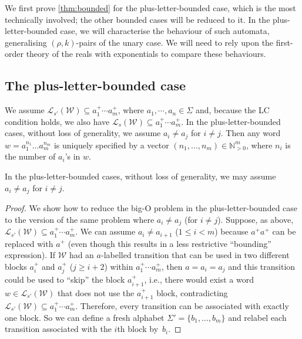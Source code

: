\documentclass[10pt,a4paper]{amsart}
\numberwithin{equation}{section}
\theoremstyle{plain}
\theoremstyle{definition}
\theoremstyle{remark}
\newcommand\lng[2]{\mathcal{L}_{#1}(#2)}
\newcommand\chr{a}
\newcommand\wa{\mathcal{W}}
\begin{document}
We first prove \cref{thm:bounded} for the plus-letter-bounded case, which is the most technically involved; the other bounded cases will be reduced to it.
 In the plus-letter-bounded case, we will characterise the behaviour of such automata, generalising $(\rho,k)$-pairs of the unary case.
We will  need to rely upon the first-order theory of the reals with exponentials to compare these behaviours.

\subsection{The plus-letter-bounded case}
\label{sec:plusletterbounded}
We assume $\lng{s'}{\wa} \subseteq a_1^+\cdots a_m^+$, where $a_1, \cdots, a_n\in\Sigma$ and, because the LC condition holds, we also have  $\lng{s}{\wa} \subseteq a_1^+\cdots a_m^+$. In the plus-letter-bounded cases, without loss of generality, we assume $\chr_i\ne \chr_j$ for $i\neq j$.  Then any word $w = a_1^{n_1}\dots a_m^{n_m}$ is uniquely specified by a vector $(n_1,\dots,n_m)\in \mathbb{N}^m_{>0}$, where $n_i$ is the number of $a_i$'s in $w$.

\begin{prop}\label{claim:plbadditionaform}
In the plus-letter-bounded cases, without loss of generality, we may assume $\chr_i\ne \chr_j$ for $i\neq j$.
\end{prop}
\begin{proof}
We show how to reduce the big-O problem in the plus-letter-bounded case to the version of the same problem where $\chr_i\ne \chr_j$ (for $i\neq j$). Suppose, as above, $\lng{s'}{\wa} \subseteq a_1^+\cdots a_m^+$.
We can assume $a_i\neq a_{i+1}$ ($1\le i < m$) because $a^+ a^+$ can be replaced with $a^+$ (even though this results in a less restrictive ``bounding'' expression).
If $\wa$ had an $a$-labelled transition that can be used in two different blocks $a_i^+$ and $a_j^+$ ($j \ge i+2$) within $a_1^+\cdots a_m^+$, then $a = a_i = a_j$ and this transition could be used to ``skip'' the block $a_{i+1}^+$, i.e., there would exist a word $w \in \lng{s'}{\wa}$ that does not use the $a_{i+1}^+$ block, contradicting  $\lng{s'}{\wa} \subseteq a_1^+\cdots a_m^+$.
Therefore, every transition can be associated with exactly one block.
So we can define a fresh alphabet $\Sigma' = \{b_1, \ldots, b_m\}$ and relabel each transition associated with the $i$th block by~$b_i$.
\end{proof}
\end{document}
